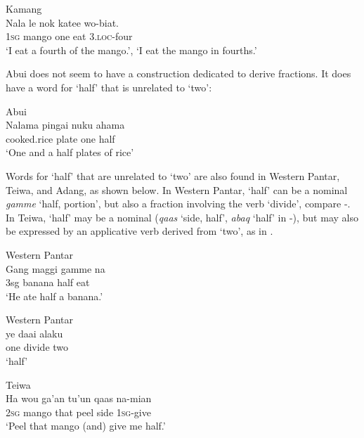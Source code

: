 \ea%
\label{bkm:Ref342746258}
{\upshape Kamang}\\
\gll  Nala  le  nok  katee  wo-biat.  \\  
   \textsc{1sg} mango  one  eat  3.\textsc{loc}-four    \\
\glt `I eat a fourth of the mango.', `I eat the mango in fourths.'
\z

     

 

Abui does not seem to have a construction dedicated to derive fractions. It does have a word for `half' that is unrelated to `two':  


\ea
\label{ex:8:1249}
{\upshape Abui}\\
 \gll   Nalama  pingai  nuku  ahama   \\
    cooked.rice  plate  one  half   \\
 \glt  `One and a half plates of rice'  
\z

 
Words for `half' that are unrelated to `two' are also found in Western Pantar,  Teiwa, and Adang, as shown below.  In Western Pantar, `half' can be a nominal \textit{gamme} `half, portion', but also a fraction involving the verb `divide', compare -. In Teiwa, `half' may be a nominal (\textit{qaas} `side, half', \textit{abaq} `half' in -), but may also be expressed by an applicative verb derived from `two', as in .


\ea%
\label{bkm:Ref342746707}
{\upshape Western Pantar}\\
\gll   Gang  maggi  gamme  na  \\  
      3sg  banana  half  eat  \\
\glt  `He ate half a banana.'
\z








\ea%
\label{bkm:Ref342746708}
{\upshape Western Pantar}\\
\gll  ye  daai  alaku   \\  
    one  divide  two    \\
\glt  `half' 
\z








\ea%
\label{bkm:Ref342746924}
{\upshape Teiwa}\\
\gll  Ha  wou  ga'an  tu'un  qaas  na-mian \\  
     \textsc{2sg} mango  that  peel  side  \textsc{1sg}{}-give \\
\glt  `Peel that mango (and) give me half.'
\z








